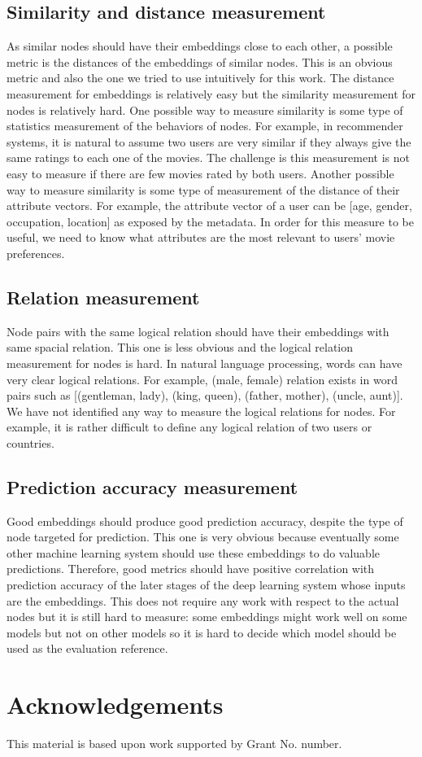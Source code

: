 \documentclass[conference]{IEEEtran}
\begin{document}
\subsection{Similarity and distance measurement}
As similar nodes should have their embeddings close to each other, a possible metric is the distances of the embeddings of similar nodes.
This is an obvious metric and also the one we tried to use intuitively for this work.
The distance measurement for embeddings is relatively easy but the similarity measurement for nodes is relatively hard.
One possible way to measure similarity is some type of statistics measurement of the behaviors of nodes.
For example, in recommender systems, it is natural to assume two users are very similar if they always give the same ratings to each one of the movies.
The challenge is this measurement is not easy to measure if there are few movies rated by both users.
Another possible way to measure similarity is some type of measurement of the distance of their attribute vectors.
For example, the attribute vector of a user can be [age, gender, occupation, location] as exposed by the metadata.
In order for this measure to be useful, we need to know what attributes are the most relevant to users' movie preferences.

\subsection{Relation measurement}
Node pairs with the same logical relation should have their embeddings with same spacial relation.
This one is less obvious and the logical relation measurement for nodes is hard.
In natural language processing, words can have very clear logical relations.
For example, (male, female) relation exists in word pairs such as [(gentleman, lady), (king, queen), (father, mother), (uncle, aunt)].
We have not identified any way to measure the logical relations for nodes.
For example, it is rather difficult to define any logical relation of two users or countries.

\subsection{Prediction accuracy measurement}
Good embeddings should produce good prediction accuracy, despite the type of node targeted for prediction.
This one is very obvious because eventually some other machine learning system should use these embeddings to do valuable predictions.
Therefore, good metrics should have positive correlation with prediction accuracy of the later stages of the deep learning system whose inputs are the embeddings.
This does not require any work with respect to the actual nodes but it is still hard to measure: some embeddings might work well on some models but not on other models so it is hard to decide which model should be used as the evaluation reference.

\section*{Acknowledgements}
This material is based upon work supported by Grant No. number.



\end{document}
